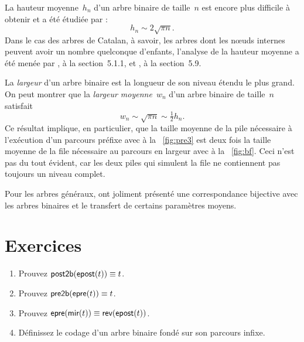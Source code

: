
La hauteur moyenne~\(h_n\) d'un
arbre binaire de taille~\(n\) est encore plus difficile à obtenir et a
été étudiée par
\cite{FlajoletOdlyzko_1981,BrownShubert_1984,FlajoletOdlyzko_1984,Odlyzko_1984}:
\begin{equation*}
h_n \sim 2 \sqrt{\pi n}.
\end{equation*}
Dans le cas des arbres de Catalan, à savoir, les arbres dont les
nœuds internes peuvent avoir un nombre quelconque d'enfants,
l'analyse de la hauteur moyenne a été menée par
\cite{DasarathyYang_1980,DershowitzZaks_1981}, \cite{Kemp_1984} à la
section~5.1.1, \cite{DershowitzZaks_1990,KnuthdeBruijnRice_2000b} et
\cite{SedgewickFlajolet_1996}, à la
section~5.9.


La \emph{largeur} d'un arbre binaire est
la longueur de son niveau étendu le plus grand. On peut montrer que la \emph{largeur
  moyenne}~\(w_n\) d'un arbre binaire de
taille~\(n\) satisfait
\begin{equation*}
w_n \sim \sqrt{\pi n} \sim \tfrac{1}{2} h_n.
\end{equation*}
Ce résultat implique, en particulier, que la taille moyenne de la pile
nécessaire à l'exécution d'un parcours préfixe avec
 à la
\fig~\vref{fig:pre3} est deux fois la taille moyenne de la file
nécessaire au parcours en largeur avec 
à la \fig~\vref{fig:bf}. Ceci n'est pas du tout évident, car les deux
piles qui simulent la file ne contiennent pas toujours un niveau
complet.

Pour les arbres généraux, \cite{DasarathyYang_1980} ont joliment
présenté une correspondance bijective avec les arbres binaires et le
transfert de certains paramètres moyens.

\section*{Exercices}

\begin{enumerate}

  \item Prouvez \(\textsf{post2b}(\textsf{epost}(t)) \equiv t\).

  \item Prouvez \(\textsf{pre2b}(\textsf{epre}(t)) \equiv t\).

  \item Prouvez \(\textsf{epre}(\textsf{mir}(t)) \equiv
    \textsf{rev}(\textsf{epost}(t))\).

  \item Définissez le codage d'un arbre binaire fondé sur son parcours
    infixe.

\end{enumerate}
